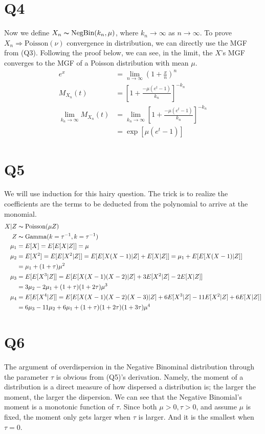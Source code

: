 \documentclass[11pt, letterpaper]{article}
\begin{document}
\newpage
\section{Q4}
Now we define $X_n \thicksim \text{NegBin}(k_n, \mu)$, where $k_n \rightarrow \infty$ as $n \rightarrow \infty$. To prove $X_n \Rightarrow \text{Poisson}(\nu)$ convergence in distribution, we can directly use the MGF from (Q3). Following the proof below, we can see, in the limit, the $X$'s MGF converges to the MGF of a Poisson distribution with mean $\mu$.
\begin{align*}
    e^x &= \lim_{n\rightarrow \infty} (1 + \frac{x}{n})^n \\
    M_{X_n}(t) &= \left[ 1 + \frac{-\mu(e^t-1)}{k_n} \right]^{-k_n} \\
    \lim_{k_n \rightarrow \infty} M_{X_n}(t)
        &= \lim_{k_n \rightarrow \infty} \left[ 1 + \frac{-\mu(e^t-1)}{k_n} \right]^{-k_n} \\
        &= \exp[\mu (e^t-1)]
\end{align*}

\section{Q5}
We will use induction for this hairy question. The trick is to realize the coefficients are the terms to be deducted from the polynomial to arrive at the monomial.
\begin{align*}
    X|Z &\thicksim \text{Poisson}(\mu Z) \\
    Z &\thicksim \text{Gamma}(k=\tau^{-1}, k=\tau^{-1}) \\
    \mu_1 &= E[X] = E[E[X|Z]] = \mu \\
    \mu_2 &= E[X^2] = E[E[X^2|Z]] = E[E[X(X-1)|Z] + E[X|Z]] = \mu_1 + E[E[X(X-1)|Z]] \\
        &= \mu_1 + (1+\tau)\mu^2 \\
    \mu_3 &= E[E[X^3|Z]] = E[E[X(X-1)(X-2)|Z] + 3E[X^2|Z] - 2E[X|Z]] \\
        &= 3\mu_2 - 2\mu_1 + (1+\tau)(1+2\tau)\mu^3 \\
    \mu_4 &= E[E[X^4|Z]] = E[E[X(X-1)(X-2)(X-3)|Z] + 6E[X^3|Z] - 11E[X^2|Z] + 6E[X|Z]] \\
        &= 6\mu_3 - 11\mu_2 + 6\mu_1 + (1+\tau)(1+2\tau)(1+3\tau)\mu^4
\end{align*}

\section{Q6}
The argument of overdispersion in the Negative Binominal distribution through the parameter $\tau$ is obvious from (Q5)'s derivation. Namely, the moment of a distribution is a direct measure of how dispersed a distribution is; the larger the moment, the larger the dispersion. We can see that the Negative Binomial's moment is a monotonic function of $\tau$. Since both $\mu > 0, \tau > 0$, and assume $\mu$ is fixed, the moment only gets larger when $\tau$ is larger. And it is the smallest when $\tau = 0$.
\end{document}
